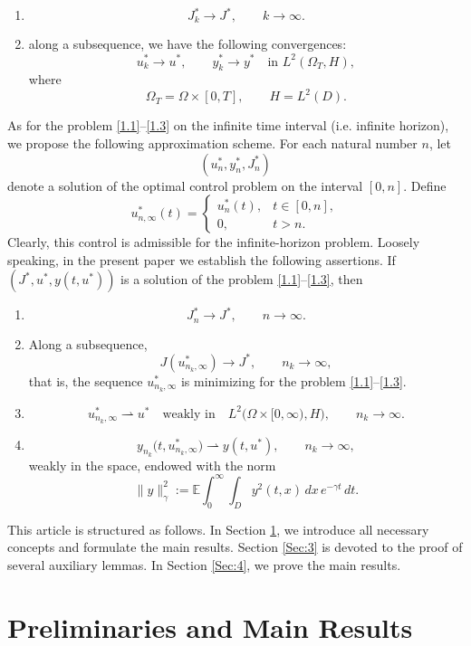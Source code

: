 \documentclass[a4paper,12pt]{article}
\numberwithin{equation}{section}
\def\E{\mathbb{E}}
\begin{document}
\begin{enumerate}
\item[(a)]
\[
J_k^* \to J^*,
\qquad k\to\infty.
\]

\item[(b)]
along a subsequence, we have the following convergences:
\[
u_k^* \to u^*,
\qquad
y_k^* \to y^*
\quad\text{in }L^2(\Omega_T,H),
\]
where
\[
\Omega_T=\Omega\times[0,T],
\qquad
H=L^2(D).
\]
\end{enumerate}
As for the problem \eqref{1.1}--\eqref{1.3} on the infinite time interval (i.e. infinite horizon), we propose the following approximation scheme. For each natural number $n$, let
\[
(u_n^*,y_n^*,J_n^*)
\]
denote a solution of the optimal control problem on the interval
$[0,n]$. Define
\[
u_{n,\infty}^*(t)
=
\begin{cases}
u_n^*(t), & t\in[0,n],\\[1ex]
0, & t>n.
\end{cases}
\]
Clearly, this control is admissible for the infinite-horizon problem. Loosely speaking, in the present paper we establish the following assertions. If  $(J^*,u^*,y(t,u^*))$ is a solution of the problem \eqref{1.1}--\eqref{1.3}, then
\begin{enumerate}
\item[(a)]
\[
J_n^* \to J^*,
\qquad n\to\infty.
\]
\item[(b)]
Along a subsequence,
\[
J(u_{n_k,\infty}^*)
\to
J^*,
\qquad
n_k\to\infty,
\]
that is, the sequence $u_{n_k,\infty}^*$ is minimizing for the problem
\eqref{1.1}--\eqref{1.3}.
\item[(c)]
\[
u_{n_k,\infty}^*
\rightharpoonup
u^*
\quad\text{weakly in}\quad
L^2\bigl(\Omega\times[0,\infty),H\bigr),
\qquad
n_k\to\infty.
\]
\item[(d)]
\[
y_{n_k}\bigl(t,u_{n_k,\infty}^*\bigr)
\rightharpoonup
y(t,u^*),
\qquad
n_k\to\infty,
\]
weakly in the space, endowed with the norm
\[
\|y\|_\gamma^2:= \E\int_0^\infty
\int_D
y^2(t,x)\,dx\,e^{-\gamma t}\,dt.
\]
\end{enumerate}


This article is structured as follows.
In Section \ref{Sec:2}, we introduce all necessary concepts and formulate the
main results.
Section \ref{Sec:3} is devoted to the proof of several auxiliary lemmas.
In Section \ref{Sec:4}, we prove the main results.

\section{Preliminaries and Main Results}\label{Sec:2}
\end{document}
